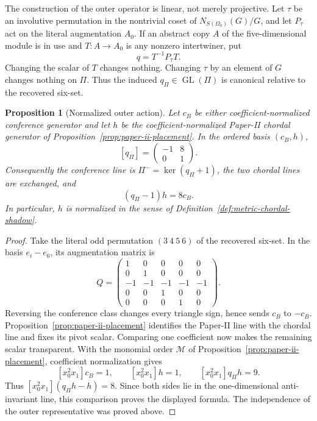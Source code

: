 \documentclass[11pt]{article}
\newtheorem{proposition}[theorem]{Proposition}
\theoremstyle{definition}
\theoremstyle{remark}
\begin{document}
The construction of the outer operator is linear, not merely projective.
Let \(\tau\) be an involutive permutation in the nontrivial coset of
\(N_{S(\Omega_0)}(G)/G\), and let \(P_\tau\) act on the literal augmentation
\(A_0\).  If an abstract copy \(A\) of the five-dimensional module is in use
and \(T:A\to A_0\) is any nonzero intertwiner, put
\[
                         q=T^{-1}P_\tau T.
\]
Changing the scalar of \(T\) changes nothing.  Changing \(\tau\) by an
element of \(G\) changes nothing on \(\Pi\).  Thus the induced
\(q_\Pi\in\operatorname{GL}(\Pi)\) is canonical relative to the recovered
six-set.

\begin{proposition}[Normalized outer action]
\label{prop:outer-pencil-action}
Let \(c_B\) be either coefficient-normalized conference generator and let
\(h\) be the coefficient-normalized Paper-II chordal generator of
Proposition~\ref{prop:paper-ii-placement}.  In the
ordered basis \((c_B,h)\),
\[
              [q_\Pi]=\begin{pmatrix}-1&8\\0&1\end{pmatrix}.
\]
Consequently the conference line is \(\Pi^-=\ker(q_\Pi+1)\), the two chordal
lines are exchanged, and
\[
          (q_\Pi-1)h=8c_B.
\]
In particular, \(h\) is normalized in the sense of
Definition~\ref{def:metric-chordal-shadow}.
\end{proposition}

\begin{proof}
Take the literal odd permutation \((3\ 4\ 5\ 6)\) of the recovered six-set.
In the basis \(e_i-e_6\), its augmentation matrix is
\[
 Q=\begin{pmatrix}
 1&0&0&0&0\\
 0&1&0&0&0\\
 -1&-1&-1&-1&-1\\
 0&0&1&0&0\\
 0&0&0&1&0
 \end{pmatrix}.
\]
Reversing the conference class changes every triangle sign, hence sends
\(c_B\) to \(-c_B\).  Proposition~\ref{prop:paper-ii-placement} identifies
the Paper-II line with the chordal line and fixes its pivot scalar.  Comparing one
coefficient now makes the remaining scalar transparent.  With the monomial
order \(\mathcal M\) of Proposition~\ref{prop:paper-ii-placement}, coefficient
normalization gives
\[
 [x_0^2x_1]c_B=1,\qquad [x_0^2x_1]h=1,\qquad
 [x_0^2x_1]q_\Pi h=9.
\]
Thus \([x_0^2x_1](q_\Pi h-h)=8\).  Since both sides lie in the
one-dimensional anti-invariant line, this comparison proves the displayed
formula.  The independence of the outer representative was proved above.
\end{proof}
\end{document}
